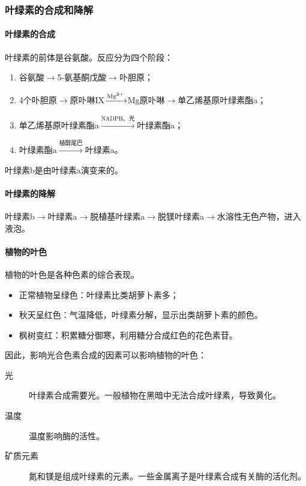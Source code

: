 \subsubsection{叶绿素的合成和降解}

\paragraph{叶绿素的合成}

叶绿素的前体是谷氨酸。反应分为四个阶段：
\begin{enumerate}
	\item 谷氨酸$\longrightarrow$5-氨基酮戊酸$\longrightarrow$卟胆原；
	\item 4个卟胆原$\longrightarrow$原卟啉IX$\xrightarrow{\ce{Mg^{2+}}}$Mg原卟啉$\longrightarrow$单乙烯基原叶绿素酯a；
	\item 单乙烯基原叶绿素酯a$\xrightarrow{\text{NADPH、光}}$叶绿素酯a；
	\item 叶绿素酯a$\xrightarrow{植醇尾巴}$叶绿素a。
\end{enumerate}

叶绿素b是由叶绿素a演变来的。

\paragraph{叶绿素的降解}

叶绿素b$\longrightarrow$叶绿素a$\longrightarrow$脱植基叶绿素a$\longrightarrow$脱镁叶绿素a$\longrightarrow$水溶性无色产物，进入液泡。

\paragraph{植物的叶色}

植物的叶色是各种色素的综合表现。

\begin{itemize}
	\item 正常植物呈绿色：叶绿素比类胡萝卜素多；
	\item 秋天呈红色：气温降低，叶绿素分解，显示出类胡萝卜素的颜色。
	\item 枫树变红：积累糖分御寒，利用糖分合成红色的花色素苷。
\end{itemize}

因此，影响光合色素合成的因素可以影响植物的叶色：

\begin{description}
	\item[光] 叶绿素合成需要光。一般植物在黑暗中无法合成叶绿素，导致黄化。
	\item[温度] 温度影响酶的活性。
	\item[矿质元素] 氮和镁是组成叶绿素的元素。一些金属离子是叶绿素合成有关酶的活化剂。
\end{description}

